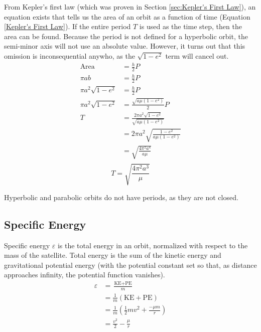 \documentclass[../basicOrbitalDynamics.tex]{subfiles}
\begin{document}
From Kepler's first law (which was proven in Section \ref{sec:Kepler's First Law}), an equation exists that tells us the area of an orbit as a function of time (Equation \eqref{Kepler's First Law}). If the entire period $T$ is used as the time step, then the area can be found. Because the period is not defined for a hyperbolic orbit, the semi-minor axis will not use an absolute value. However, it turns out that this omission is inconsequential anywho, as the $\sqrt{1-e^2}$ term will cancel out.
\begin{align*}
    \text{Area}          & = \frac{h}{2}P                                     \\
    \pi{}ab              & = \frac{h}{2}P                                     \\
    \pi{}a^2\sqrt{1-e^2} & = \frac{h}{2}P                                     \\
    \pi{}a^2\sqrt{1-e^2} & = \frac{\sqrt{a\mu(1-e^2)}}{2}P                    \\
    T                    & = \frac{2\pi{}a^2\sqrt{1-e^2}}{\sqrt{a\mu(1-e^2)}} \\
                         & = 2\pi{}a^2\sqrt{\frac{1-e^2}{a\mu(1-e^2)}}        \\
                         & = \sqrt{\frac{4\pi^2a^4}{a\mu}}                    \\
\end{align*}
\begin{equation}\label{Period Geometric}
    T = \sqrt{\frac{4\pi^2a^3}{\mu}}
\end{equation}

Hyperbolic and parabolic orbits do not have periods, as they are not closed.

\bigskip\bigskip
\subsection{Specific Energy}\label{sec:Specific Energy}

Specific energy $\varepsilon$ is the total energy in an orbit, normalized with respect to the mass of the satellite. Total energy is the sum of the kinetic energy and gravitational potential energy (with the potential constant set so that, as distance approaches infinity, the potential function vanishes).
\begin{align*}
    \varepsilon & =\frac{\text{KE}+\text{PE}}{m}                             \\
                & =\frac{1}{m}(\text{KE}+\text{PE})                          \\
                & =\frac{1}{m}\left(\frac{1}{2}mv^2+\frac{-\mu{}m}{r}\right) \\
                & =\frac{v^2}{2}-\frac{\mu{}}{r}                             \\
\end{align*}
\end{document}

